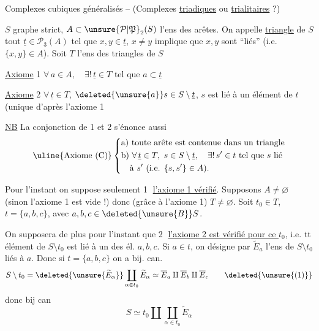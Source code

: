 Complexes cubiques généralisés -- (Complexes \uline{triadiques} ou \uline{trialitaires} ?)

$S$ graphe strict, $A\subset\unsure{\mathcal P|\mathfrak P}_2(S)$ l'ens des arêtes. On  appelle \uline{triangle} de $S$ tout $\underline t\in\mathcal P_3(A)$ tel que $x,y\in\underline t$, $x\ne y$ implique que $x,y$ sont ``liés'' (i.e. $\{x,y\}\in A$). Soit $T$ l'ens des triangles de $S$

\uline{Axiome} 1 \quad $\forall\,a\in A,\quad\exists!\,\underline t\in T$ tel que $a\subset\underline t$

\uline{Axiome} 2 \quad $\forall\,\underline t\in T$, $\deleted{\unsure{a}}s\in S\setminus\underline t$, $s$ est lié à un élément de $t$ (unique d'après l'axiome 1

\uline{NB} La conjonction de 1 et 2 s'énonce aussi
\[
\uline{\text{Axiome (C)}}\left\{\begin{aligned}
&\text{a) toute arête est contenue dans un triangle}\\
&\text{b) }\forall\,\underline t\in T,\ s\in S\setminus\underline t,\quad\exists!\,s'\in t\ \text{tel que }s\text{ lié}\\
&\quad \text{à }s'\ (\text{i.e. }\{s,s'\}\in A).
\end{aligned}\right.
\]

Pour l'instant on suppose seulement \textcircled{1} \uline{l'axiome 1 vérifié}. Supposons $A\ne\varnothing$ (sinon l'axiome 1 est vide !) donc (grâce à l'axiome 1) $T\ne\varnothing$. Soit $t_0\in T$,  $t=\{a,b,c\}$, avec $a,b,c\in \deleted{\unsure{B}}S$.

On supposera de plus pour l'instant que \textcircled{2} \uline{l'axiome 2 est vérifié pour ce $t_0$}, i.e. tt élément de $S\setminus t_0$ est lié à un des él. $a,b,c$. Si $a\in t$, on désigne par $\widetilde E_a$ l'ens de $S\setminus t_0$ liés à $a$. Donc si $t=\{a,b,c\}$ on a bij. can.
\[
S\setminus t_0=\deleted{\unsure{\widetilde E_\alpha}}\coprod_{\alpha\in t_0}\widetilde E_\alpha
\simeq\overline E_a\amalg\overline E_b\amalg\overline E_c
\tag*{\deleted{\unsure{(1)}}}
\]
donc bij can
\[
S\simeq t_0\amalg\coprod_{\alpha\in t_0}\widetilde E_\alpha
\tag*{(1)}
\]

